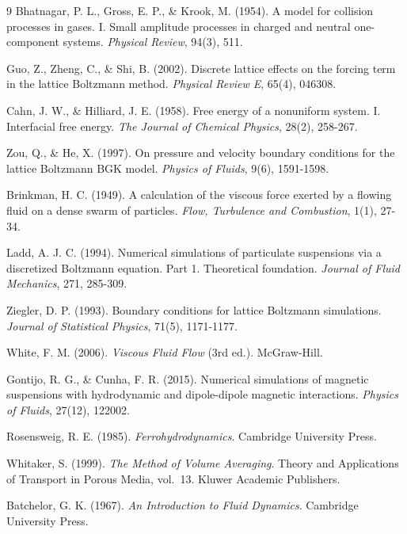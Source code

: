 \begin{thebibliography}{9}
Bhatnagar, P. L., Gross, E. P., \& Krook, M. (1954). A model for collision processes in gases. I. Small amplitude processes in charged and neutral one-component systems. \emph{Physical Review}, 94(3), 511.

Guo, Z., Zheng, C., \& Shi, B. (2002). Discrete lattice effects on the forcing term in the lattice Boltzmann method. \emph{Physical Review E}, 65(4), 046308.

Cahn, J. W., \& Hilliard, J. E. (1958). Free energy of a nonuniform system. I. Interfacial free energy. \emph{The Journal of Chemical Physics}, 28(2), 258-267.

Zou, Q., \& He, X. (1997). On pressure and velocity boundary conditions for the lattice Boltzmann BGK model. \emph{Physics of Fluids}, 9(6), 1591-1598.

Brinkman, H. C. (1949). A calculation of the viscous force exerted by a flowing fluid on a dense swarm of particles. \emph{Flow, Turbulence and Combustion}, 1(1), 27-34.

Ladd, A. J. C. (1994). Numerical simulations of particulate suspensions via a discretized Boltzmann equation. Part 1. Theoretical foundation. \emph{Journal of Fluid Mechanics}, 271, 285-309.

Ziegler, D. P. (1993). Boundary conditions for lattice Boltzmann simulations. \emph{Journal of Statistical Physics}, 71(5), 1171-1177.

White, F. M. (2006). \emph{Viscous Fluid Flow} (3rd ed.). McGraw-Hill.

Gontijo, R. G., \& Cunha, F. R. (2015). Numerical simulations of magnetic suspensions with hydrodynamic and dipole-dipole magnetic interactions. \emph{Physics of Fluids}, 27(12), 122002.

Rosensweig, R. E. (1985). \emph{Ferrohydrodynamics}. Cambridge University Press.

Whitaker, S. (1999). \emph{The Method of Volume Averaging}. Theory and Applications of Transport in Porous Media, vol.~13. Kluwer Academic Publishers.

Batchelor, G. K. (1967). \emph{An Introduction to Fluid Dynamics}. Cambridge University Press.


\end{thebibliography}
